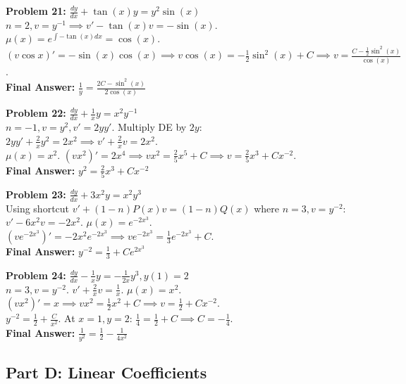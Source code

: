 \documentclass[12pt]{article}
\begin{document}
\vspace{10pt}
\textbf{Problem 21:} $\frac{dy}{dx} + \tan(x)y = y^2 \sin(x)$ \\
$n=2, v=y^{-1} \implies v' - \tan(x)v = -\sin(x)$. \\
$\mu(x) = e^{\int -\tan(x) dx} = \cos(x)$. \\
$(v\cos x)' = -\sin(x)\cos(x) \implies v\cos(x) = -\frac{1}{2}\sin^2(x) + C \implies v = \frac{C - \frac{1}{2}\sin^2(x)}{\cos(x)}$. \\
\textbf{Final Answer:} $\frac{1}{y} = \frac{2C - \sin^2(x)}{2\cos(x)}$

\vspace{10pt}
\textbf{Problem 22:} $\frac{dy}{dx} + \frac{1}{x}y = x^2 y^{-1}$ \\
$n=-1, v=y^2, v'=2yy'$. Multiply DE by $2y$: \\
$2yy' + \frac{2}{x}y^2 = 2x^2 \implies v' + \frac{2}{x}v = 2x^2$. \\
$\mu(x) = x^2$. $(vx^2)' = 2x^4 \implies vx^2 = \frac{2}{5}x^5 + C \implies v = \frac{2}{5}x^3 + Cx^{-2}$. \\
\textbf{Final Answer:} $y^2 = \frac{2}{5}x^3 + Cx^{-2}$

\vspace{10pt}
\textbf{Problem 23:} $\frac{dy}{dx} + 3x^2 y = x^2 y^3$ \\
Using shortcut $v' + (1-n)P(x)v = (1-n)Q(x)$ where $n=3, v=y^{-2}$: \\
$v' - 6x^2 v = -2x^2$. $\mu(x) = e^{-2x^3}$. \\
$(v e^{-2x^3})' = -2x^2 e^{-2x^3} \implies v e^{-2x^3} = \frac{1}{3}e^{-2x^3} + C$. \\
\textbf{Final Answer:} $y^{-2} = \frac{1}{3} + Ce^{2x^3}$

\vspace{10pt}
\textbf{Problem 24:} $\frac{dy}{dx} - \frac{1}{x}y = -\frac{1}{2x}y^3, y(1)=2$ \\
$n=3, v=y^{-2}$. $v' + \frac{2}{x}v = \frac{1}{x}$. $\mu(x) = x^2$. \\
$(vx^2)' = x \implies vx^2 = \frac{1}{2}x^2 + C \implies v = \frac{1}{2} + Cx^{-2}$. \\
$y^{-2} = \frac{1}{2} + \frac{C}{x^2}$. At $x=1, y=2$: $\frac{1}{4} = \frac{1}{2} + C \implies C = -\frac{1}{4}$. \\
\textbf{Final Answer:} $\frac{1}{y^2} = \frac{1}{2} - \frac{1}{4x^2}$

\subsection*{Part D: Linear Coefficients}
\end{document}
